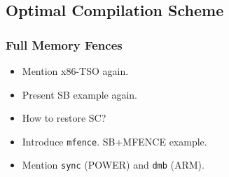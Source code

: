 



\subsection{Optimal Compilation Scheme}

\subsubsection{Full Memory Fences}

\begin{itemize}
  \item Mention x86-TSO again.
  \item Present SB example again. 
  \item How to restore SC?
  \item Introduce \texttt{mfence}. SB+MFENCE example.
  \item Mention \texttt{sync} (POWER) and \texttt{dmb} (ARM).
\end{itemize}

